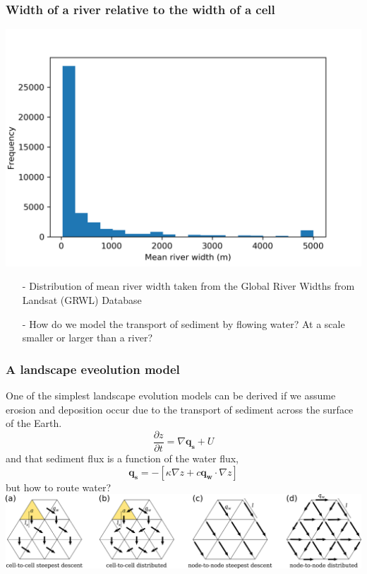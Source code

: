 \documentclass[aspectratio=169]{beamer}
\begin{document}
\begin{frame}
    \frametitle{Width of a river relative to the width of a cell}
    \centering
    \includegraphics[height=0.6\paperheight]{./figures/river-width.png}
    \begin{itemize}
        \item[-]{Distribution of mean river width taken from the Global River Widths from Landsat (GRWL) Database \citep{allen-2018}}
        \item[-]{How do we model the transport of sediment by flowing water? At a scale smaller or larger than a river?}
    \end{itemize}
\end{frame}

\begin{frame}
    \frametitle{A landscape eveolution model}
    One of the simplest landscape evolution models can be derived if we assume erosion and deposition occur due to the
    transport of sediment across the surface of the Earth.
    \[
    \frac{\partial z}{\partial t} = \nabla{\mathbf{q_{s}} + U}
    \]
    and that sediment flux is a function of the water flux,
    \[
    \mathbf{q_{s}} = - \left[\kappa \nabla{z} + c \mathbf{q_{w}} \cdot \nabla{z}\right]
    \]
    but how to route water?
    \includegraphics[width=0.8\paperwidth]{./figures/MFDandSFD.png}
\end{frame}
\end{document}
